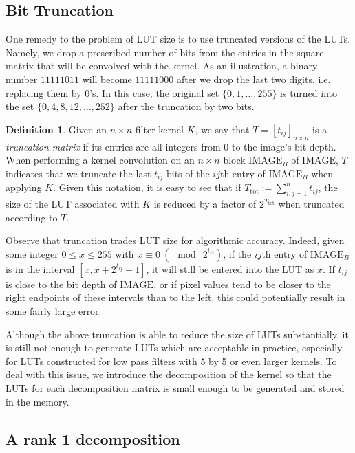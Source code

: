 \documentclass[12pt]{amsart}
\theoremstyle{definition}
\newtheorem{defn}[thm]{Definition}
\theoremstyle{remark}
\numberwithin{thm}{section}
\newcommand{\IMAGE}{\text{IMAGE}}
\begin{document}
\subsection{Bit Truncation}\label{subsection:bit_truncation}
One remedy to the problem of LUT size is to use truncated versions of the LUTs. Namely, we drop a prescribed number of bits from the entries in the square matrix that will be convolved with the kernel. As an illustration, a binary number $11111011$ will become $11111000$ after we drop the last two digits, i.e. replacing them by $0$'s. In this case, the original set $\{0,1,\dots,255\}$ is turned into the set $\{0,4,8,12,\dots,252\}$ after the truncation by two bits.

\begin{defn}\label{defn:truncation_matrix}
Given an $n\times n$ filter kernel $K$, we say that $T= [t_{ij}]_{n\times n}$ is a \emph{truncation matrix} if its entries are all integers from 0 to the image's bit depth. When performing a kernel convolution on an $n\times n$ block $\IMAGE_B$ of $\IMAGE$, $T$ indicates that we truncate the last $t_{ij}$ bits of the $ij$th entry of $\IMAGE_B$ when applying $K$. Given this notation, it is easy to see that if $T_\text{tot} := \sum_{i,j=1}^nt_{ij}$, the size of the LUT associated with $K$ is reduced by a factor of $2^{T_\text{tot}}$ when truncated according to $T$.
\end{defn}

Observe that truncation trades LUT size for algorithmic accuracy. Indeed, given some integer $0\le x\le 255$ with $x \equiv 0\ (\!\!\!\mod\ 2^{t_{ij}})$, if the $ij$th entry of $\text{IMAGE}_B$ is in the interval $[x,x+2^{t_{ij}}-1]$, it will still be entered into the LUT as $x$. If $t_{ij}$ is close to the bit depth of $\text{IMAGE}$, or if pixel values tend to be closer to the right endpoints of these intervals than to the left, this could potentially result in some fairly large error. 

Although the above truncation is able to reduce the size of LUTs substantially, it is still not enough to generate LUTs which are acceptable in practice, especially for LUTs constructed for low pass filters with 5 by 5 or even larger kernels. To deal with this issue, we introduce the decomposition of the kernel so that the LUTs for each decomposition matrix is small enough to be generated and stored in the memory. 

\subsection{A rank 1 decomposition}
\end{document}
